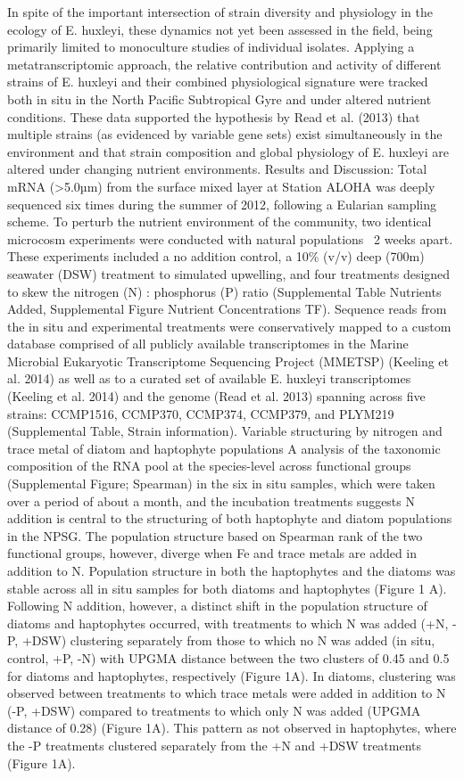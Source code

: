In spite of the important intersection of strain diversity and physiology in the ecology of E. huxleyi, these dynamics not yet been assessed in the field, being primarily limited to monoculture studies of individual isolates. Applying a metatranscriptomic approach, the relative contribution and activity of different strains of E. huxleyi and their combined physiological signature were tracked both in situ in the North Pacific Subtropical Gyre and under altered nutrient conditions. These data supported the hypothesis by Read et al. (2013) that multiple strains (as evidenced by variable gene sets) exist simultaneously in the environment and that strain composition and global physiology of E. huxleyi are altered under changing nutrient environments. 
Results and Discussion:  	
Total mRNA (>5.0µm) from the surface mixed layer at Station ALOHA was deeply sequenced six times during the summer of 2012, following a Eularian sampling scheme. To perturb the nutrient environment of the community, two identical microcosm experiments were conducted with natural populations ~2 weeks apart. These experiments included a no addition control, a 10\% (v/v) deep (700m) seawater (DSW) treatment to simulated upwelling, and four treatments designed to skew the nitrogen (N) : phosphorus (P) ratio (Supplemental Table Nutrients Added, Supplemental Figure Nutrient Concentrations TF). Sequence reads from the in situ and experimental treatments were conservatively mapped to a custom database comprised of all publicly available transcriptomes in the Marine Microbial Eukaryotic Transcriptome Sequencing Project (MMETSP) (Keeling et al. 2014) as well as to a curated set of available E. huxleyi transcriptomes (Keeling et al. 2014) and the genome (Read et al. 2013) spanning across five strains: CCMP1516, CCMP370, CCMP374, CCMP379, and PLYM219 (Supplemental Table, Strain information).
Variable structuring by nitrogen and trace metal of diatom and haptophyte populations
A analysis of the taxonomic composition of the RNA pool at the species-level across functional groups (Supplemental Figure; Spearman) in the six in situ samples, which were taken over a period of about a month, and the incubation treatments suggests N addition is central to the structuring of both haptophyte and diatom populations in the NPSG. The population structure based on Spearman rank of the two functional groups, however, diverge when Fe and trace metals are added in addition to N. Population structure in both the haptophytes and the diatoms was stable across all in situ samples for both diatoms and haptophytes (Figure 1 A). Following N addition, however, a distinct shift in the population structure of diatoms and haptophytes occurred, with treatments to which N was added (+N, -P, +DSW) clustering separately from those to which no N was added (in situ, control, +P, -N) with UPGMA distance between the two clusters of 0.45 and 0.5 for diatoms and haptophytes, respectively (Figure 1A). In diatoms, clustering was observed between treatments to which trace metals were added in addition to N (-P, +DSW) compared to treatments to which only N was added (UPGMA distance of 0.28) (Figure 1A). This pattern as not observed in haptophytes, where the -P treatments clustered separately from the +N and +DSW treatments (Figure 1A). 
